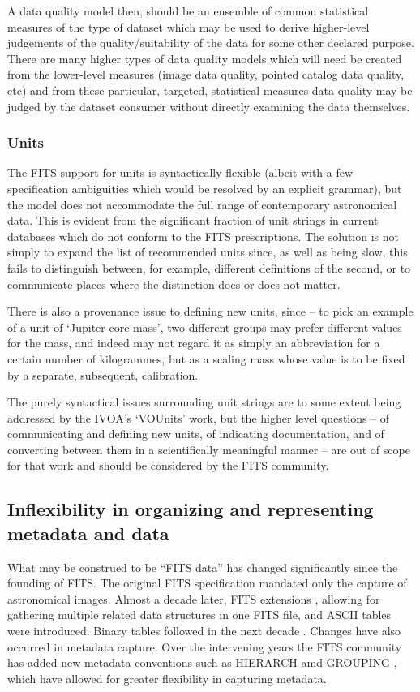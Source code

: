 \documentclass[final,authoryear,5p,times,twocolumn]{elsarticle}
\begin{document}
A data quality model then, should be an ensemble of common statistical
measures of the type of dataset which may be used to derive
higher-level judgements of the quality/suitability of the data for
some other declared purpose. There are many higher types of data
quality models which will need be created from the lower-level
measures (image data quality, pointed catalog data quality, etc) and
from these particular, targeted, statistical measures data quality may
be judged by the dataset consumer without directly examining the data
themselves.


\subsubsection{Units}


The FITS support for units is syntactically flexible (albeit with
a few specification ambiguities which would be resolved by an explicit
grammar), but the model does not accommodate the full range of
contemporary astronomical data.  This is evident from the significant
fraction of unit strings in current databases which do not conform to
the FITS prescriptions.  The solution is not simply to expand the list
of recommended units since, as well as being slow, this fails to
distinguish between, for example, different definitions of the second,
or to communicate places where the distinction does or does not
matter.

There is also a provenance issue to defining new units, since -- to
pick an example of a unit of `Jupiter core mass', two different
groups may prefer different values for the mass, and indeed may not
regard it as simply an abbreviation for a certain number of
kilogrammes, but as a scaling mass whose value is to be fixed by a
separate, subsequent, calibration.

The purely syntactical issues surrounding unit strings are to some
extent being addressed by the IVOA's `VOUnits' work, but the higher
level questions -- of communicating and defining new units, of
indicating documentation, and of converting between them in a
scientifically meaningful manner -- are out of scope for that work and
should be considered by the FITS community.


\subsection{Inflexibility in organizing and representing metadata and data}


What may be construed to be ``FITS data'' has changed significantly
since the founding of FITS. The original FITS specification mandated
only the capture of astronomical images. Almost a decade later, FITS
extensions \citep{1988A&AS...73..359G}, allowing for gathering
multiple related data structures in one FITS file, and ASCII tables
\citep{1988A&AS...73..365H} were introduced. Binary tables followed in
the next decade \citep{1995A&AS..113..159C}. Changes have also
occurred in metadata capture. Over the intervening years the FITS
community has added new metadata conventions such as HIERARCH
\citep{2009Wic} amd GROUPING \citep{2007Jen}, which have allowed for
greater flexibility in capturing metadata.
\end{document}
